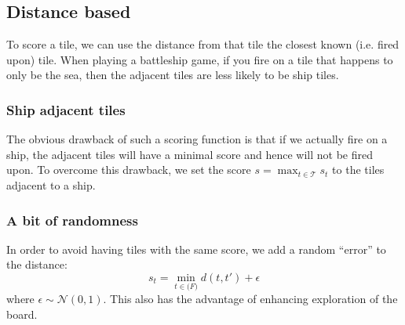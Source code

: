 \documentclass[a4paper]{article}
\begin{document}
\subsection{Distance based} %
\label{sub:distance_based}

To score a tile, we can use the distance from that tile the closest known (i.e. fired upon) tile. When playing a battleship game, if you fire on a tile that happens to only be the sea, then the adjacent tiles are less likely to be ship tiles.

\subsubsection{Ship adjacent tiles} %
\label{ssub:tiles_adjacent_to_a_ship}

The obvious drawback of such a scoring function is that if we actually fire on a ship, the adjacent tiles will have a minimal score and hence will not be fired upon. To overcome this drawback, we set the score $s = \max_{t \in \mathcal{T}}s_t$ to the tiles adjacent to a ship.


\subsubsection{A bit of randomness} %
\label{ssub:a_bit_of_randomness}

In order to avoid having tiles with the same score, we add a random ``error'' to the distance:
\begin{equation*}
s_t = \min_{t \in \mathcal(F)}d(t, t') + \epsilon
\end{equation*}
where $\epsilon \sim \mathcal{N}(0, 1)$. This also has the advantage of enhancing exploration of the board.



\end{document}
